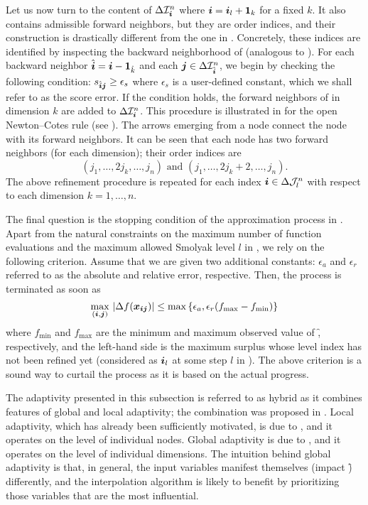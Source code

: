 Let us now turn to the content of $\Delta\mathcal{I}^{n}_{\boldsymbol{i}}$ where $\boldsymbol{i} =
\boldsymbol{i}_l + \boldsymbol{1}_k$ for a fixed $k$. It also contains admissible forward neighbors,
but they are order indices, and their construction is drastically different from
the one in . Concretely, these indices are
identified by inspecting the backward neighborhood of \vi (analogous to
). For each backward neighbor $\hat{\boldsymbol{i}} = \boldsymbol{i} -
\boldsymbol{1}_{\hat{k}}$ and each $\boldsymbol{j} \in \Delta\mathcal{I}^{n}_{\hat{\boldsymbol{i}}}$, we begin
by checking the following condition: $s_{\hat{\boldsymbol{i}} \boldsymbol{j}} \geq \epsilon_s$ where
$\epsilon_s$ is a user-defined constant, which we shall refer to as the score
error. If the condition holds, the forward neighbors of \vj in dimension $k$ are
added to $\Delta\mathcal{I}^{n}_{\boldsymbol{i}}$. This procedure is illustrated in
 for the open Newton--Cotes rule (see ). The arrows
emerging from a node connect the node with its forward neighbors. It can be seen
that each node has two forward neighbors (for each dimension); their order
indices are
\[
  (j_1, \dots, 2 j_k, \dots, j_n) \text{ and } (j_1, \dots, 2 j_k + 2, \dots, j_n).
\]
The above refinement procedure is repeated for each index $\boldsymbol{i} \in
\Delta\mathcal{J}^{n}_{l}$ with respect to each dimension $k = 1, \dots, n$.

The final question is the stopping condition of the approximation process in
. Apart from the natural constraints on the maximum number
of function evaluations and the maximum allowed Smolyak level $l$ in
, we rely on the following criterion. Assume that we are
given two additional constants: $\epsilon_a$ and $\epsilon_r$ referred to as the
absolute and relative error, respective. Then, the process is terminated as soon
as
\[
  \max_{(\boldsymbol{i}, \boldsymbol{j})} \, |\Delta f(\boldsymbol{x}_{\boldsymbol{i} \boldsymbol{j}})| \leq \max \left\{ \epsilon_a, \epsilon_r (f_\text{max} - f_\text{min}) \right\}
\]
where $f_\text{min}$ and $f_\text{max}$ are the minimum and maximum observed
value of \f, respectively, and the left-hand side is the maximum surplus whose
level index has not been refined yet (considered as $\boldsymbol{i}_l$ at some step $l$ in
). The above criterion is a sound way to curtail the process
as it is based on the actual progress.

The adaptivity presented in this subsection is referred to as hybrid as it
combines features of global and local adaptivity; the combination was proposed
in \cite{jakeman2012}. Local adaptivity, which has already been sufficiently
motivated, is due to \cite{ma2009}, and it operates on the level of individual
nodes. Global adaptivity is due to \cite{klimke2006}, and it operates on the
level of individual dimensions. The intuition behind global adaptivity is that,
in general, the input variables manifest themselves (impact \f) differently, and
the interpolation algorithm is likely to benefit by prioritizing those variables
that are the most influential.

